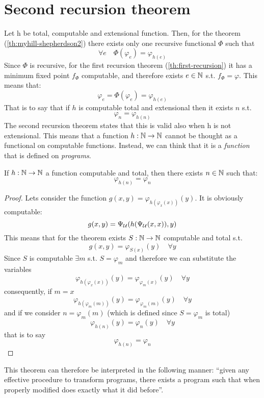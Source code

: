 \chapter{Second recursion theorem}
Let h be total, computable and extensional function. Then, for the
theorem (\ref{th:myhill-shepherdson2}) there exists only one recursive
functional $\Phi$ such that
\[ \forall e \quad \Phi(\varphi_e) = \varphi_{h(e)} \] Since $\Phi$ is
recursive, for the first recursion theorem (\ref{th:first-recursion})
it has a minimum fixed point $f_\Phi$ computable, and therefore exists
$e\in \mathbb{N}$ s.t. $f_\Phi = \varphi$. This means that:
\[
  \varphi_e = \Phi(\varphi_e) = \varphi_{h(e)}
\]
That is to say that if $h$ is computable total and extensional then it
exists $n$ s.t. \[\varphi_n = \varphi_{h(n)}\] The second recursion
theorem states that this is valid also when h is not extensional.  This
means that a function $h : \mathbb{N} \rightarrow \mathbb{N}$ cannot be thought as a
functional on computable functions. Instead, we can think that it is a
\emph{function} that is defined on \emph{programs}.

\begin{theorem}\label{th:second-recursion}
  If $h : \mathbb{N} \rightarrow \mathbb{N}$ a function computable and total, then there exists
  $n \in \mathbb{N}$ such that:
  \[
    \varphi_{h(n)} = \varphi_n
  \]
  \begin{proof}
    Lets consider the function
    $g(x,y) = \varphi_{h(\varphi_x(x))}(y)$. It is obviously
    computable:
    \[ g(x,y) = \Psi_{\mathcal{U}}(h(\Psi_{\mathcal{U}}(x,x)), y) \] This means that for the
    \smn theorem exists $S : \mathbb{N} \rightarrow \mathbb{N}$ computable and total s.t.
    \[
      g(x,y) = \varphi_{S(x)}(y) \quad \forall y
    \]
    Since $S$ is computable $\exists m$ s.t. $S = \varphi_m$ and therefore
    we can substitute the variables
    \[
      \varphi_{h(\varphi_x(x))}(y) = \varphi_{\varphi_m(x)}(y) \quad \forall y
    \]
    consequently, if $m=x$
    \[
      \varphi_{h(\varphi_m(m))}(y) = \varphi_{\varphi_m(m)}(y) \quad \forall y
    \]
    and if we consider $n = \varphi_m(m)$ (which is defined since
    $S = \varphi_m$ is total)
    \[
      \varphi_{h(n)}(y)  = \varphi_n(y) \quad \forall y
    \]
    that is to say
    \[
      \varphi_{h(n)} = \varphi_n
    \]
  \end{proof}
\end{theorem}

This theorem can therefore be interpreted in the following manner:
``given any effective procedure to transform programs, there exists a
program such that when properly modified does exactly what it did
before''.

